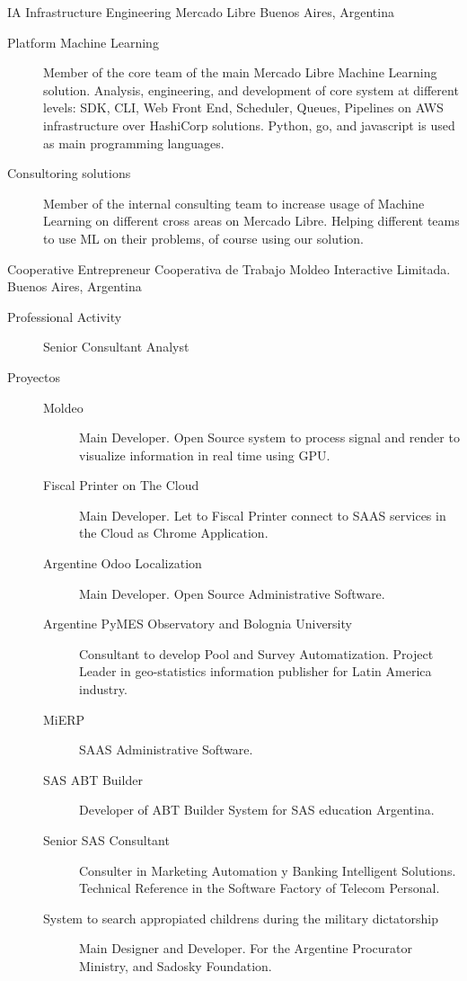 \documentclass[9pt,a4paper,sans]{moderncv}
\begin{document}
	{IA Infrastructure Engineering}
	{Mercado Libre}
	{Buenos Aires, Argentina}
	{}
	{\begin{description}
	 \item [Platform Machine Learning] Member of the core team of the main Mercado Libre Machine Learning solution. Analysis, engineering, and development of core system at different levels: SDK, CLI, Web Front End, Scheduler, Queues, Pipelines on AWS infrastructure over HashiCorp solutions. Python, go, and javascript is used as main programming languages.
	 \item [Consultoring solutions] Member of the internal consulting team to increase usage of Machine Learning on different cross areas on Mercado Libre. Helping different teams to use ML on their problems, of course using our solution.
	\end{description}}
	{Cooperative Entrepreneur}
	{Cooperativa de Trabajo Moldeo Interactive Limitada.}
	{Buenos Aires, Argentina}
	{}
	{\begin{description}
	\item [Professional Activity] Senior Consultant Analyst
	\item [Proyectos]
	\begin{description}
		\item [Moldeo] Main Developer. Open Source system to process signal and render to visualize information in real time using GPU.
		\item [Fiscal Printer on The Cloud] Main Developer. Let to Fiscal Printer connect to SAAS services in the Cloud as Chrome Application.
		\item [Argentine Odoo Localization] Main Developer. Open Source Administrative Software.
		\item [Argentine PyMES Observatory and Bolognia University] Consultant to develop Pool and Survey Automatization. Project Leader in geo-statistics information publisher for Latin America industry.
		\item [MiERP] SAAS Administrative Software.
		\item [SAS ABT Builder] Developer of ABT Builder System for SAS education Argentina.
		\item [Senior SAS Consultant] Consulter in Marketing Automation y Banking Intelligent Solutions. Technical Reference in the Software Factory of Telecom Personal.
		\item [System to search appropiated childrens during the military dictatorship] Main Designer and Developer. For the Argentine Procurator Ministry, and Sadosky Foundation.
	\end{description}
	\end{description}}
\end{document}

